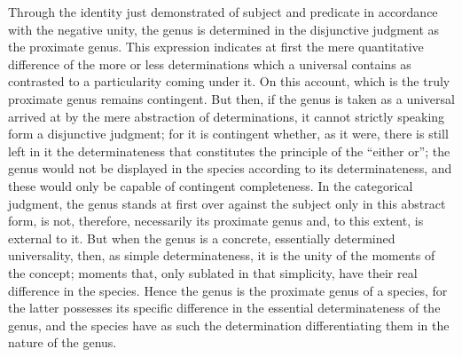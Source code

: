 Through the identity just demonstrated of
subject and predicate in accordance
with the negative unity,
the genus is determined in the disjunctive judgment
as the proximate genus.
This expression indicates at first
the mere quantitative difference of
the more or less determinations
which a universal contains as contrasted to
a particularity coming under it.
On this account, which is the
truly proximate genus remains contingent.
But then, if the genus is taken as a universal
arrived at by the mere abstraction of determinations,
it cannot strictly speaking form a disjunctive judgment;
for it is contingent whether, as it were,
there is still left in it the determinateness
that constitutes the principle of the “either or”;
the genus would not be displayed in the species
according to its determinateness,
and these would only be capable of contingent completeness.
In the categorical judgment, the genus stands at first
over against the subject only in this abstract form,
is not, therefore, necessarily its proximate genus
and, to this extent, is external to it.
But when the genus is a concrete,
essentially determined universality,
then, as simple determinateness,
it is the unity of the moments of the concept;
moments that, only sublated in that simplicity,
have their real difference in the species.
Hence the genus is the proximate genus of a species,
for the latter possesses its specific difference
in the essential determinateness of the genus,
and the species have as such the determination
differentiating them in the nature of the genus.

